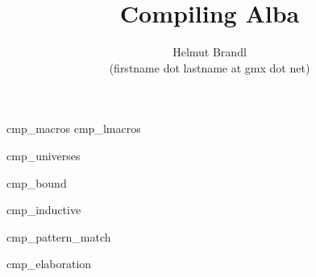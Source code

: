 \documentclass[12pt]{article}
\begin{document}


\title{
    Compiling Alba
}

\author{
    Helmut Brandl
    \\
    \scriptsize (firstname dot lastname at gmx dot net)
}
\date{}

\maketitle




\tableofcontents

 {cmp_macros}
 {cmp_lmacros}


 {cmp_universes}

 {cmp_bound}

 {cmp_inductive}

{
    \def\ct{f_\text{ct}}

     {cmp_pattern_match}
}

 {cmp_elaboration}
\end{document}
